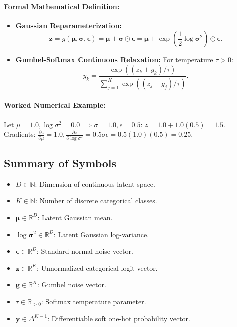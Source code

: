 \documentclass[11pt]{article}
\begin{document}
\paragraph{Formal Mathematical Definition:}
\begin{itemize}
    \item \textbf{Gaussian Reparameterization:}
    \begin{equation}
    \label{eq:gaussian_reparam}
    \mathbf{z} = g(\boldsymbol{\mu}, \boldsymbol{\sigma}, \boldsymbol{\epsilon}) = \boldsymbol{\mu} + \boldsymbol{\sigma} \odot \boldsymbol{\epsilon} = \boldsymbol{\mu} + \exp\left(\frac{1}{2}\log\boldsymbol{\sigma}^2\right) \odot \boldsymbol{\epsilon}.
    \end{equation}
    \item \textbf{Gumbel-Softmax Continuous Relaxation:} For temperature $\tau > 0$:
    \begin{equation}
    \label{eq:gumbel_softmax}
    y_k = \frac{\exp((z_k + g_k)/\tau)}{\sum_{j=1}^K \exp((z_j + g_j)/\tau)}.
    \end{equation}
\end{itemize}

\paragraph{Worked Numerical Example:}
Let $\mu = 1.0, \log\sigma^2 = 0.0 \implies \sigma = 1.0, \epsilon = 0.5$:
$z = 1.0 + 1.0(0.5) = 1.5$.
Gradients: $\frac{\partial z}{\partial \mu} = 1.0, \frac{\partial z}{\partial \log\sigma^2} = 0.5 \sigma \epsilon = 0.5(1.0)(0.5) = 0.25$.

\subsection{Summary of Symbols}
\begin{itemize}
    \item $D \in \mathbb{N}$: Dimension of continuous latent space.
    \item $K \in \mathbb{N}$: Number of discrete categorical classes.
    \item $\boldsymbol{\mu} \in \mathbb{R}^D$: Latent Gaussian mean.
    \item $\log\boldsymbol{\sigma}^2 \in \mathbb{R}^D$: Latent Gaussian log-variance.
    \item $\boldsymbol{\epsilon} \in \mathbb{R}^D$: Standard normal noise vector.
    \item $\mathbf{z} \in \mathbb{R}^K$: Unnormalized categorical logit vector.
    \item $\mathbf{g} \in \mathbb{R}^K$: Gumbel noise vector.
    \item $\tau \in \mathbb{R}_{>0}$: Softmax temperature parameter.
    \item $\mathbf{y} \in \Delta^{K-1}$: Differentiable soft one-hot probability vector.
\end{itemize}
\end{document}
